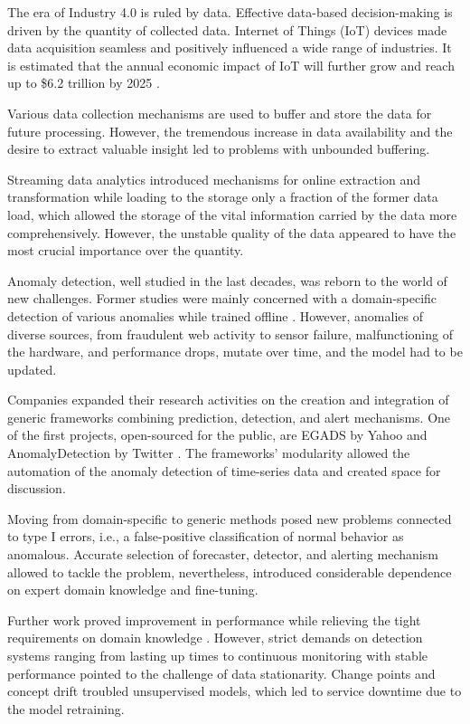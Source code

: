 The era of Industry 4.0 is ruled by data. Effective data-based decision-making is driven by the quantity of collected data. Internet of Things (IoT) devices made data acquisition seamless and positively influenced a wide range of industries. It is estimated that the annual economic impact of IoT will further grow and reach up to \$6.2 trillion by 2025 \cite{Manyika2013}.

Various data collection mechanisms are used to buffer and store the data for future processing. However, the tremendous increase in data availability and the desire to extract valuable insight led to problems with unbounded buffering.

Streaming data analytics introduced mechanisms for online extraction and transformation while loading to the storage only a fraction of the former data load, which allowed the storage of the vital information carried by the data more comprehensively. However, the unstable quality of the data appeared to have the most crucial importance over the quantity.

Anomaly detection, well studied in the last decades, was reborn to the world of new challenges. Former studies were mainly concerned with a domain-specific detection of various anomalies while trained offline \cite{Chandola2009}. However, anomalies of diverse sources, from fraudulent web activity to sensor failure, malfunctioning of the hardware, and performance drops, mutate over time, and the model had to be updated.

Companies expanded their research activities on the creation and integration of generic frameworks combining prediction, detection, and alert mechanisms. One of the first projects, open-sourced for the public, are EGADS by Yahoo \cite{Laptev2015} and AnomalyDetection by Twitter \cite{Kejariwal2015}. The frameworks' modularity allowed the automation of the anomaly detection of time-series data and created space for discussion.

Moving from domain-specific to generic methods posed new problems connected to type I errors, i.e., a false-positive classification of normal behavior as anomalous. Accurate selection of forecaster, detector, and alerting mechanism allowed to tackle the problem, nevertheless, introduced considerable dependence on expert domain knowledge and fine-tuning.

Further work proved improvement in performance while relieving the tight requirements on domain knowledge \cite{Ahmad2016}. However, strict demands on detection systems ranging from lasting up times to continuous monitoring with stable performance pointed to the challenge of data stationarity. Change points and concept drift troubled unsupervised models, which led to service downtime due to the model retraining.

